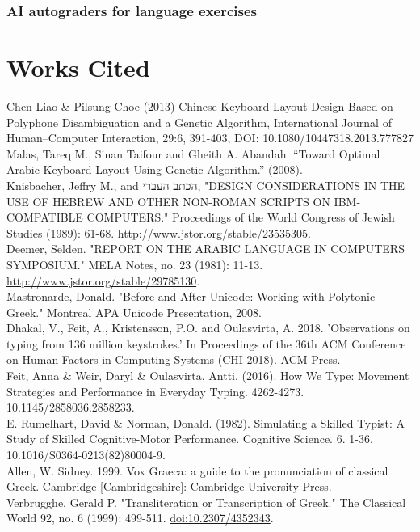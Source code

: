 \documentclass[11pt]{article}
\begin{document}
\subsubsection{AI autograders for language exercises}
\label{sec:org5c525b6}



\section{Works Cited}
\label{sec:org9dbe20b}

Chen Liao \& Pilsung Choe (2013) Chinese Keyboard Layout Design Based on Polyphone Disambiguation and a Genetic Algorithm, International Journal of Human–Computer Interaction, 29:6, 391-403, DOI: 10.1080/10447318.2013.777827 \\

Malas, Tareq M., Sinan Taifour and Gheith A. Abandah. “Toward Optimal Arabic Keyboard Layout Using Genetic Algorithm.” (2008). \\

Knisbacher, Jeffry M., and \texthebrew{הכתב העברי}, "DESIGN CONSIDERATIONS IN THE USE OF HEBREW AND OTHER NON-ROMAN SCRIPTS ON IBM-COMPATIBLE COMPUTERS." Proceedings of the World Congress of Jewish Studies (1989): 61-68. \url{http://www.jstor.org/stable/23535305}. \\

Deemer, Selden. "REPORT ON THE ARABIC LANGUAGE IN COMPUTERS SYMPOSIUM." MELA Notes, no. 23 (1981): 11-13. \url{http://www.jstor.org/stable/29785130}. \\

Mastronarde, Donald. "Before and After Unicode: Working with Polytonic Greek." Montreal APA Unicode Presentation, 2008. \\

Dhakal, V., Feit, A., Kristensson, P.O. and Oulasvirta, A. 2018. 'Observations on typing from 136 million keystrokes.' In Proceedings of the 36th ACM Conference on Human Factors in Computing Systems (CHI 2018). ACM Press. \\

Feit, Anna \& Weir, Daryl \& Oulasvirta, Antti. (2016). How We Type: Movement Strategies and Performance in Everyday Typing. 4262-4273. 10.1145/2858036.2858233. \\

E. Rumelhart, David \& Norman, Donald. (1982). Simulating a Skilled Typist: A Study of Skilled Cognitive-Motor Performance. Cognitive Science. 6. 1-36. 10.1016/S0364-0213(82)80004-9. \\

Allen, W. Sidney. 1999. Vox Graeca: a guide to the pronunciation of classical Greek. Cambridge [Cambridgeshire]: Cambridge University Press. \\

Verbrugghe, Gerald P. "Transliteration or Transcription of Greek." The Classical World 92, no. 6 (1999): 499-511. \url{doi:10.2307/4352343}.
\end{document}
